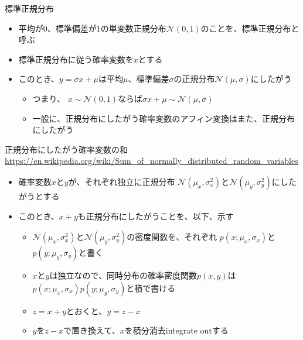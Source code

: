 \documentclass[aspectratio=169,unicode,dvipdfmx,14pt]{beamer}
\begin{document}
\begin{frame}{標準正規分布}
\begin{itemize}
\item 平均が0、標準偏差が1の単変数正規分布$\mathcal{N}(0,1)$のことを、標準正規分布と呼ぶ
\item 標準正規分布に従う確率変数を$x$とする
\item このとき、$y=\sigma x+\mu$は平均$\mu$、標準偏差$\sigma$の正規分布$\mathcal{N}(\mu,\sigma)$にしたがう
\begin{itemize}
\item つまり、 $x\sim\mathcal{N}(0,1)$ならば$\sigma x + \mu\sim\mathcal{N}(\mu,\sigma)$
\item 一般に、正規分布にしたがう確率変数のアフィン変換はまた、正規分布にしたがう
\end{itemize}
\end{itemize}
\end{frame}

\begin{frame}{正規分布にしたがう確率変数の和\\\vspace{-.3in}\href{https://en.wikipedia.org/wiki/Sum_of_normally_distributed_random_variables}{\footnotesize \url{https://en.wikipedia.org/wiki/Sum_of_normally_distributed_random_variables}}}
\begin{itemize}
\item 確率変数$x$と$y$が、それぞれ独立に正規分布
$\mathcal{N}(\mu_x,\sigma_x^2)$と$\mathcal{N}(\mu_y,\sigma_y^2)$にしたがうとする
\item このとき、$x+y$も正規分布にしたがうことを、以下、示す
\begin{itemize}
\item $\mathcal{N}(\mu_x,\sigma_x^2)$と$\mathcal{N}(\mu_y,\sigma_y^2)$の密度関数を、それぞれ
$p(x;\mu_x,\sigma_x)$と$p(y;\mu_y,\sigma_y)$と書く
\item $x$と$y$は独立なので、同時分布の確率密度関数$p(x,y)$は$p(x;\mu_x,\sigma_x)p(y;\mu_y,\sigma_y)$と積で書ける
\item $z=x+y$とおくと、$y=z-x$
\item $y$を$z-x$で置き換えて、$x$を積分消去integrate outする
\end{itemize}
\end{itemize}
\end{frame}
\end{document}
